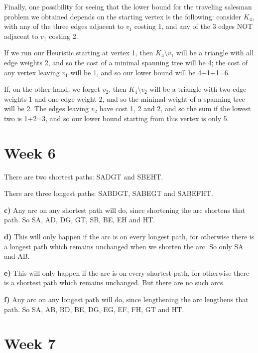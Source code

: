 \documentclass{amsart}
\begin{document}
    Finally, one possibility for seeing that the lower bound for the traveling salesman problem we obtained depends on the starting vertex is the following: consider $K_4$, with any of the three edges adjacent to $v_1$ costing 1, and any of the 3 edges NOT adjacent to $v_1$ costing 2.

    If we run our Heuristic starting at vertex 1, then $K_4\setminus v_1$ will be a triangle with all edge weights 2, and so the cost of a minimal spanning tree will be 4; the cost of any vertex leaving $v_1$ will be 1, and so our lower bound will be 4+1+1=6.

    If, on the other hand, we forget $v_2$, then $K_4\setminus v_2$ will be a triangle with two edge weights 1 and one edge weight 2, and so the minimal weight of a spanning tree will be 2.  The edges leaving $v_2$ have cost 1, 2 and 2, and so the sum if the lowest two is 1+2=3, and so our lower bound starting from this vertex is only 5.


\section{Week 6}
    

There are two shortest paths: SADGT and SBEHT.


There are three longest paths: SABDGT, SABEGT and SABEFHT.

\vspace{1.5ex}
\textbf{c)} Any arc on any shortest path will do, since shortening the arc shortens that path. So SA, AD, DG, GT, SB, BE, EH and HT.

\vspace{1.5ex}
\textbf{d)} This will only happen if the arc is on every longest path, for otherwise there is a longest path which remains unchanged when we shorten the arc. So only SA and AB.

\vspace{1.5ex}
\textbf{e)} This will only happen if the arc is on every shortest path, for otherwise there is a shortest path which remains unchanged. But there are no such arcs.

\vspace{1.5ex}
\textbf{f)} Any arc on any longest path will do, since lengthening the arc lengthens that path. So SA, AB, BD, BE, DG, EG, EF, FH, GT and HT.

\section{Week 7}
\end{document}
